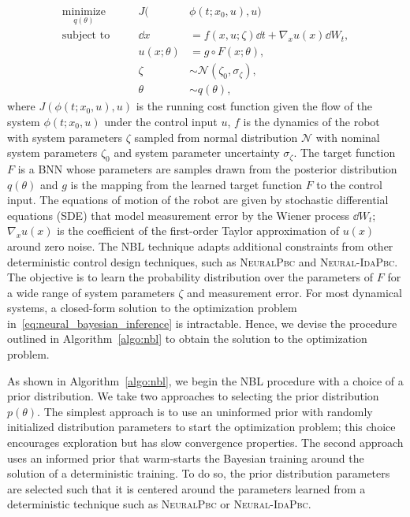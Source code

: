 \begin{equation}
    \begin{aligned}
        \underset{q(\theta) }{\textrm{minimize}} 
        &&\quad J(&\phi(t; x_0, u), u) \\
        \textrm{subject to} 
        &&\quad \dd {x} &= f(x, u; \zeta) \dd t + \nabla_x u(x) \dd W_t, \\
        &&\quad u(x; \theta) &= g \circ F(x; \theta), \\
        &&\quad \zeta &\sim \mathcal{N}(\zeta_0, \sigma_\zeta), \\
        &&\quad \theta &\sim q(\theta),
    \end{aligned}    
    \label{eq:neural_bayesian_inference}%
  \end{equation}
%
where $J(\phi(t; x_0, u), u)$ is the running cost function given the flow of the
system $\phi(t; x_0, u)$ under the control input $u$, $f$ is the dynamics of the
robot with system parameters $\zeta$ sampled from normal distribution
$\mathcal{N}$ with nominal system parameters $\zeta_0$ and system parameter
uncertainty $\sigma_\zeta$. The target function $F$ is a BNN whose parameters
are samples drawn from the posterior distribution $q(\theta)$ and $g$ is the
mapping from the learned target function $F$ to the control input. The equations
of motion of the robot are given by stochastic differential equations (SDE)
that model measurement error by the Wiener process $\dd W_t$; $\nabla_x u(x)$ is
the coefficient of the first-order Taylor approximation of $u(x)$ around zero
noise. The NBL technique adapts additional constraints from other deterministic
control design techniques, such as \textsc{NeuralPbc} and \textsc{Neural-IdaPbc}.
The objective is to learn the probability distribution over the parameters of
$F$ for a wide range of system parameters $\zeta$ and measurement error. For
most dynamical systems, a closed-form solution to the optimization problem
in~\eqref{eq:neural_bayesian_inference} is intractable. Hence, we devise the
procedure outlined in Algorithm~\ref{algo:nbl} to obtain the solution to the
optimization problem. 

As shown in Algorithm~\ref{algo:nbl}, we begin the NBL procedure with a choice
of a prior distribution. We take two approaches to selecting the prior
distribution $p(\theta)$. The simplest approach is to use an uninformed prior
with randomly initialized distribution parameters to start the optimization
problem; this choice encourages exploration but has slow convergence properties.
The second approach uses an informed prior that warm-starts the Bayesian
training around the solution of a deterministic training. To do so, the prior
distribution parameters are selected such that it is centered around the
parameters learned from a deterministic technique such as \textsc{NeuralPbc} or
\textsc{Neural-IdaPbc}.

